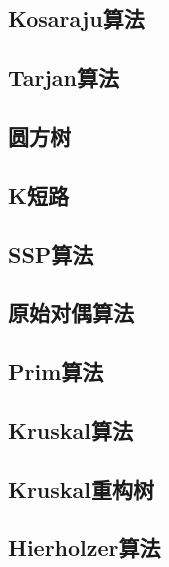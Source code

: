 \documentclass[twocolumn,a4]{article}  %
\begin{document}
		\subsection{Kosaraju算法}
	 	 	
	 	 	
	 	\subsection{Tarjan算法}
	 	 	
	 	 	
	 	\subsection{圆方树}
	 	 	
	 	 	
		\subsection{K短路}
	 	 	
	 	 	
		\subsection{SSP算法}
	 	 	
	 	 	
		\subsection{原始对偶算法}
	 	 	
	 	 	
		\subsection{Prim算法}
	 	 	
	 	 	
		\subsection{Kruskal算法}
	 	 	
	 	 	
		\subsection{Kruskal重构树}
	 	 	
	 	 	
	 	\subsection{Hierholzer算法}
	 	 	
	 	 	
\end{document}
